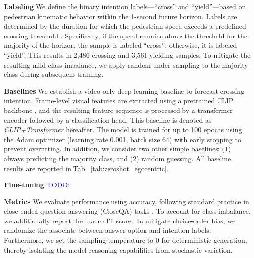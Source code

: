 \documentclass[letterpaper, 10pt, journal]{IEEEtran}  %
\newcommand{\todo}[1]{\textcolor{blue}{TODO: #1}}
\begin{document}
\textbf{Labeling} 
We define the binary intention labels—``cross'' and ``yield''—based on pedestrian kinematic behavior within the 1-second future horizon.
Labels are determined by the duration for which the pedestrian speed exceeds a predefined crossing threshold \cite{li2026eye}.
Specifically, if the speed remains above the threshold for the majority of the horizon, the sample is labeled ``cross''; otherwise, it is labeled ``yield''. This results in 2,486 crossing and 3,561 yielding samples. To mitigate the resulting mild class imbalance, we apply random under-sampling to the majority class during subsequent training. 

\textbf{Baselines}
We establish a video-only deep learning baseline to forecast crossing intention.
Frame-level visual features are extracted using a pretrained CLIP backbone \cite{radford_learning_2021}, and the resulting feature sequence is processed by a transformer encoder followed by a classification head. This baseline is denoted as \textit{CLIP+Transformer} hereafter. 
The model is trained for up to 100 epochs using the Adam optimizer (learning rate 0.001, batch size 64) with early stopping to prevent overfitting. In addition, we consider two other simple baselines: (1) always predicting the majority class, and (2) random guessing. All baseline results are reported in Tab.~\ref{tab:zeroshot_egocentric}.

\textbf{Fine-tuning}
\todo{}

\textbf{Metrics}
We evaluate performance using accuracy, following standard practice in close-ended question answering (CloseQA) tasks \cite{patel_advancing_2025, peng2025eye}. To account for class imbalance, we additionally report the macro F1 score.
To mitigate choice-order bias, we randomize the associate between answer option and intention labels. Furthermore, we set the sampling temperature to 0 for deterministic generation, thereby isolating the model reasoning capabilities from stochastic variation.
\end{document}
